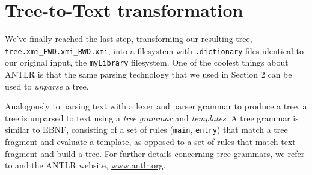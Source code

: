 \newpage
\hypertarget{finalStep}{}
\section{Tree-to-Text transformation}
\genHeader

We've finally reached the last step, transforming our resulting tree, \texttt{tree\-.xmi\-\_FWD\-.xmi\-\_BWD\-.xmi}, into a filesystem with \texttt{.dictionary}
files identical to our original input, the \texttt{myLibrary} filesystem. One of the coolest things about ANTLR is that the same parsing technology that we used
in Section 2 can be used to \emph{unparse} a tree.

Analogously to parsing text with a lexer and parser grammar to produce a tree, a tree is unparsed to text using a \emph{tree grammar} and \emph{templates}. A
tree grammar is similar to EBNF, consisting of a set of rules (\texttt{main}, \texttt{entry}) that match a tree fragment and evaluate a template, as
opposed to a set of rules that match text fragment and build a tree. For further details concerning tree grammars, we refer to \cite{ANTLR} and the ANTLR
website, \url{www.antlr.org}.

